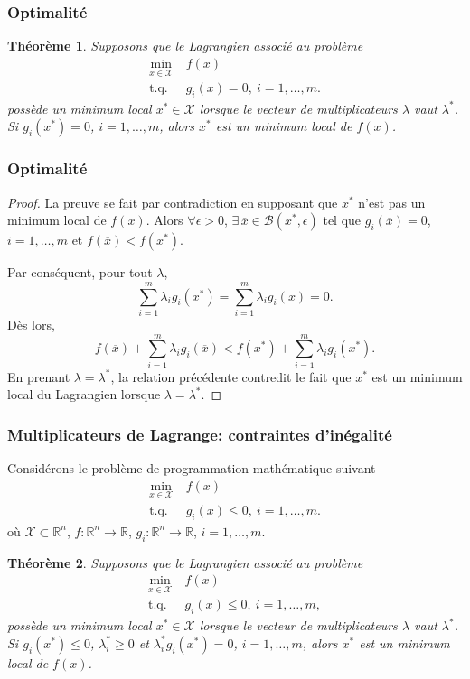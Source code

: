 \documentclass[usepdftitle=false,aspectratio=169]{beamer}
\newtheorem{thm}{Théorème}
\def\cB{\mathcal{B}}
\def\cX{\mathcal{X}}
\def\RR{\mathbb{R}}
\begin{document}
\begin{frame}
\frametitle{Optimalité}

\begin{thm}
Supposons que le Lagrangien associé au problème
\begin{align*}
\min_{x \in \cX} \ & f(x) \\
\mbox{t.q. } & g_i(x) = 0,\ i = 1,\ldots,m.
\end{align*}
possède un minimum local $x^* \in \cX$ lorsque le vecteur de multiplicateurs $\lambda$ vaut $\lambda^*$.
Si $g_i(x^*) = 0$, $i = 1,\ldots,m$, alors $x^*$ est un minimum local de $f(x)$.
\end{thm}

\end{frame}

\begin{frame}
\frametitle{Optimalité}

\begin{proof}
	La preuve se fait par contradiction en supposant que $x^*$ n'est pas un minimum local de $f(x)$.
	Alors $\forall \epsilon > 0$, $\exists\, \overline{x} \in \cB(x^*, \epsilon)$ tel que $g_i(\overline{x}) = 0$, $i = 1,\ldots,m$ et $f(\overline{x}) < f(x^*)$.
	
Par conséquent, pour tout $\lambda$,
	$$
	\sum_{i = 1}^{m} \lambda_i g_i(x^*) = \sum_{i = 1}^{m} \lambda_i g_i(\overline{x}) = 0.
	$$
	Dès lors,
$$
f(\overline{x}) + \sum_{i = 1}^{m} \lambda_i g_i(\overline{x}) < f(x^*) + \sum_{i = 1}^{m} \lambda_i g_i(x^*).
$$
En prenant $\lambda = \lambda^*$, la relation précédente contredit le fait que $x^*$ est un
minimum local du Lagrangien lorsque $\lambda = \lambda^*$.
\end{proof}

\end{frame}

\begin{frame}[shrink=3]
\frametitle{Multiplicateurs de Lagrange: contraintes d'inégalité}

Considérons le problème de programmation mathématique suivant
\begin{align*}
\min_{x \in \cX} \ & f(x) \\
\mbox{t.q. } & g_i(x) \leq 0,\ i = 1,\ldots,m.
\end{align*}
où $\cX \subset \RR^n$, $f: \RR^n \rightarrow \RR$, $g_i: \RR^n \rightarrow \RR$, $i = 1,\ldots,m$.

\mbox{}

\begin{thm}
Supposons que le Lagrangien associé au problème
\begin{align*}
\min_{x \in \cX} \ & f(x) \\
\mbox{t.q. } & g_i(x) \leq 0,\ i = 1,\ldots,m,
\end{align*}
possède un minimum local $x^* \in \cX$ lorsque le vecteur de multiplicateurs $\lambda$ vaut $\lambda^*$.
Si $g_i(x^*) \leq 0$, $\lambda^*_i \geq 0$ et $\lambda^*_i g_i(x^*) = 0$, $i = 1,\ldots,m$, alors $x^*$ est un minimum local de $f(x)$.
\end{thm}

\end{frame}
\end{document}
